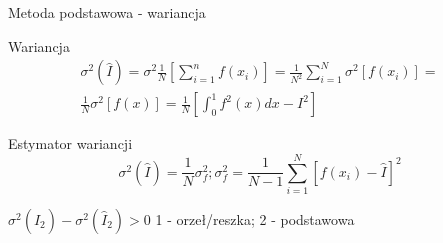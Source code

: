 \begin{frame}{Metoda podstawowa - wariancja}
	\vspace{-.5cm}
	\begin{block}{Wariancja}
		\begin{align*}
			\sigma^2(\hat{I}) = 
            \sigma^2 \frac{1}{N} \left[ 
            	\sum_{i=1}^n f(x_i)
            	\right] =
            \frac{1}{N^2} \sum_{i=1}^N \sigma^2 [f(x_i)] =
            \\
            \frac{1}{N} \sigma^2 [f(x)] = 
            \frac{1}{N} \left[ 
            	\int_0^1 f^2(x)dx - I^2
            	\right]
		\end{align*}
	\end{block}
    
    \begin{block}{Estymator wariancji}
    	\[
        	\sigma^2(\hat{I}) = \frac{1}{N} \sigma_f^2; 
            \sigma_f^2 = \frac{1}{N-1} \sum_{i=1}^N [f(x_i) - \hat{I}]^2
        \]
    \end{block}
    
    $\sigma^2(\hat{I}_2) - \sigma^2(\hat{I}_2) > 0$ \hspace{.5cm}
    1 - orzeł/reszka; \hspace{.5cm}
    2 - podstawowa
\end{frame}